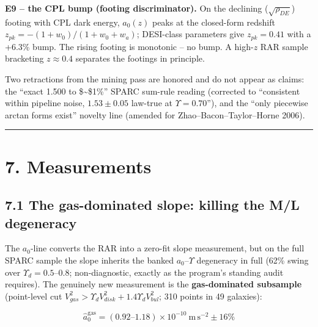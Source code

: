 \documentclass[
]{article}
\begin{document}
\textbf{E9 -- the CPL bump (footing discriminator).} On the declining
(\(\sqrt{\rho_{DE}}\)) footing with CPL dark energy, \(a_0(z)\) peaks at
the closed-form redshift \(z_{pk} = -(1+w_0)/(1+w_0+w_a)\); DESI-class
parameters give \(z_{pk} = 0.41\) with a +6.3\% bump. The rising footing
is monotonic -- no bump. A high-\(z\) RAR sample bracketing
\(z \approx 0.4\) separates the footings in principle.

Two retractions from the mining pass are honored and do not appear as
claims: the ``exact 1.500 to \$\sim\$1\%'' SPARC sum-rule reading
(corrected to ``consistent within pipeline noise, \(1.53 \pm 0.05\)
law-true at \(\Upsilon = 0.70\)''), and the ``only piecewise arctan
forms exist'' novelty line (amended for Zhao--Bacon--Taylor--Horne
2006).

\begin{center}\rule{0.5\linewidth}{0.5pt}\end{center}

\section{7. Measurements}\label{measurements}

\subsection{7.1 The gas-dominated slope: killing the M/L
degeneracy}\label{the-gas-dominated-slope-killing-the-ml-degeneracy}

The \(a_0\)-line converts the RAR into a zero-fit slope measurement, but
on the full SPARC sample the slope inherits the banked
\(a_0\)--\(\Upsilon\) degeneracy in full (62\% swing over
\(\Upsilon_d = 0.5\)--\(0.8\); non-diagnostic, exactly as the program's
standing audit requires). The genuinely new measurement is the
\textbf{gas-dominated subsample} (point-level cut
\(V_{gas}^2 > \Upsilon_d V_{disk}^2 + 1.4\Upsilon_d V_{bul}^2\); 310
points in 49 galaxies):

\[ \boxed{\; \hat a_0^{\mathrm{gas}} = (0.92\text{--}1.18)\times 10^{-10}\ \mathrm{m\,s^{-2}} \pm 16\% \;} \]
\end{document}
